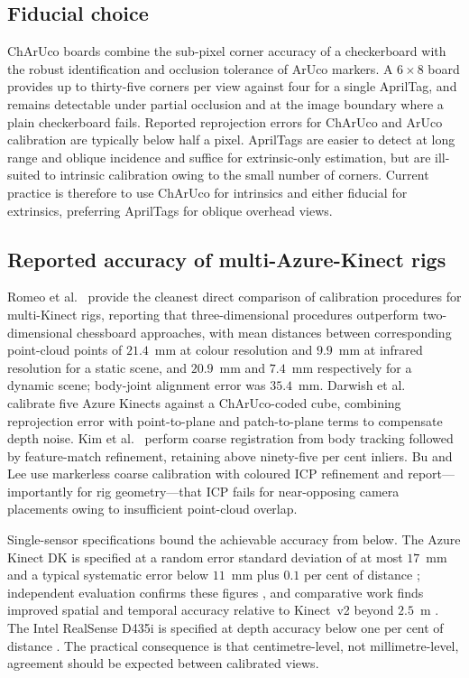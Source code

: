 \subsection{Fiducial choice}

ChArUco boards combine the sub-pixel corner accuracy of a checkerboard with the
robust identification and occlusion tolerance of ArUco markers. A $6\times8$
board provides up to thirty-five corners per view against four for a single
AprilTag, and remains detectable under partial occlusion and at the image
boundary where a plain checkerboard fails. Reported reprojection errors for
ChArUco and ArUco calibration are typically below half a pixel. AprilTags are
easier to detect at long range and oblique incidence and suffice for
extrinsic-only estimation, but are ill-suited to intrinsic calibration owing to
the small number of corners. Current practice is therefore to use ChArUco for
intrinsics and either fiducial for extrinsics, preferring AprilTags for oblique
overhead views.

\subsection{Reported accuracy of multi-Azure-Kinect rigs}

Romeo et al.\ \cite{romeo} provide the cleanest direct comparison of calibration
procedures for multi-Kinect rigs, reporting that three-dimensional procedures
outperform two-dimensional chessboard approaches, with mean distances between
corresponding point-cloud points of $21.4$~mm at colour resolution and
$9.9$~mm at infrared resolution for a static scene, and $20.9$~mm and $7.4$~mm
respectively for a dynamic scene; body-joint alignment error was $35.4$~mm.
Darwish et al.\ \cite{darwish} calibrate five Azure Kinects against a
ChArUco-coded cube, combining reprojection error with point-to-plane and
patch-to-plane terms to compensate depth noise. Kim et al.\ \cite{kimcal}
perform coarse registration from body tracking followed by feature-match
refinement, retaining above ninety-five per cent inliers. Bu and Lee
\cite{bulee} use markerless coarse calibration with coloured ICP refinement and
report---importantly for rig geometry---that ICP fails for near-opposing camera
placements owing to insufficient point-cloud overlap.

Single-sensor specifications bound the achievable accuracy from below. The
Azure Kinect DK is specified at a random error standard deviation of at most
$17$~mm and a typical systematic error below $11$~mm plus $0.1$ per cent of
distance \cite{mskinect}; independent evaluation confirms these figures
\cite{tolgyessy}, and comparative work finds improved spatial and temporal
accuracy relative to Kinect~v2 beyond $2.5$~m \cite{kurillo}. The Intel
RealSense D435i is specified at depth accuracy below one per cent of distance
\cite{intel}. The practical consequence is that centimetre-level, not
millimetre-level, agreement should be expected between calibrated views.

